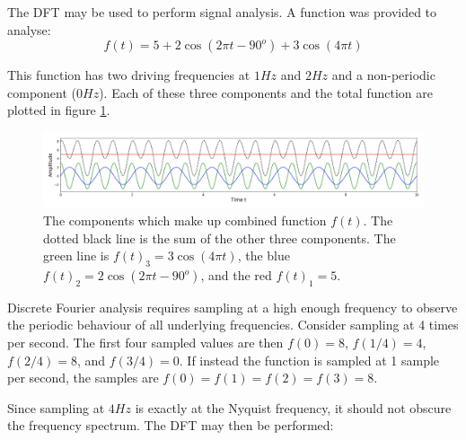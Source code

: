 \documentclass[twocolumn]{article}
\begin{document}
The DFT may be used to perform signal analysis. A function was provided to analyse:
\begin{equation}
f(t) = 5 + 2\cos(2\pi t - 90^o) + 3\cos(4\pi t)
\end{equation}

This function has two driving frequencies at $1Hz$ and $2Hz$ and a non-periodic component ($0Hz$). Each of these three components and the total function are plotted in figure \ref{fig:3functions}.

\begin{figure}
\centering
\includegraphics[width=\textwidth]{"3 functions"}
\caption{The components which make up combined function $f(t)$. The dotted black line is the sum of the other three components. The green line is $f(t)_3 = 3\cos(4\pi t)$, the blue $f(t)_2 =2\cos(2\pi t - 90^o)$, and the red $f(t)_1 = 5$. }
\label{fig:3functions}
\end{figure}

Discrete Fourier analysis requires sampling at a high enough frequency to observe the periodic behaviour of all underlying frequencies. Consider sampling at 4 times per second. The first four sampled values are then $f(0)= 8$, $f(1/4)=4$, $f(2/4)=8$, and $f(3/4)=0$. If instead the function is sampled at 1 sample per second, the samples are $f(0)=f(1)=f(2)=f(3)=8$. 

Since sampling at $4Hz$ is exactly at the Nyquist frequency, it should not obscure the frequency spectrum. The DFT may then be performed:
\end{document}
